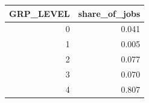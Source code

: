 \begin{tabular}{rr}
\toprule
GRP_LEVEL & share_of_jobs \\
\midrule
0 & 0.041 \\
1 & 0.005 \\
2 & 0.077 \\
3 & 0.070 \\
4 & 0.807 \\
\bottomrule
\end{tabular}
